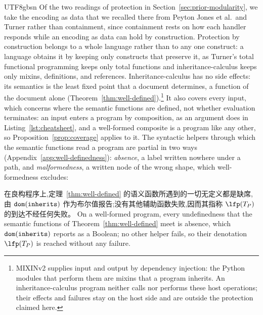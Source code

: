 \begin{CJK*}{UTF8}{gbsn}
\else
Of the two readings of protection in Section~\ref{sec:prior-modularity}, we take the encoding as data
that we recalled there from Peyton Jones et al.\ and Turner rather than containment, since containment
rests on how each handler responds while an encoding as data can hold by construction.
Protection by construction belongs to a whole language rather than to any one construct: a language
obtains it by keeping only constructs that preserve it, as Turner's total functional programming keeps
only total functions and inheritance-calculus keeps only mixins, definitions, and references. Inheritance-calculus
has no side effects: its semantics is the
least fixed point that a document determines, a function of the document alone
(Theorem~\ref{thm:well-defined}).\footnote{MIXINv2 supplies input and output by dependency
injection: the Python modules that perform them are mixins that a program inherits. An
inheritance-calculus program neither calls nor performs these host operations; their effects and
failures stay on the host side and are outside the protection claimed here.} It also covers every input, which concerns where the semantic functions are defined, not whether
evaluation terminates: an input enters a program by composition, as an argument does in Listing~\ref{lst:cheatsheet}, and a well-formed composite is a program like any
other, so Proposition~\ref{prop:coverage} applies to it.
The syntactic helpers
through which the semantic functions read a program are partial in two ways
(Appendix~\ref{app:well-definedness}): \emph{absence}, a label written nowhere under a path, and
\emph{malformedness}, a written node of the wrong shape, which well-formedness excludes:
\fi

\begin{proposition}\label{prop:coverage}
\ifPaperChinese
在良构程序上,定理~\ref{thm:well-defined} 的语义函数所遇到的一切无定义都是缺席,由 $\mathtt{dom}(\mathtt{inherits})$ 作为布尔值报告;没有其他辅助函数失败,因而其指称 $\lfp(T_P)$ 的到达不经任何失败。
\else
On a well-formed program, every undefinedness that the semantic functions of
Theorem~\ref{thm:well-defined} meet is absence, which $\mathtt{dom}(\mathtt{inherits})$ reports as a Boolean; no
other helper fails, so their denotation $\lfp(T_P)$ is reached without any failure.
\fi
\end{proposition}


\end{CJK*}

